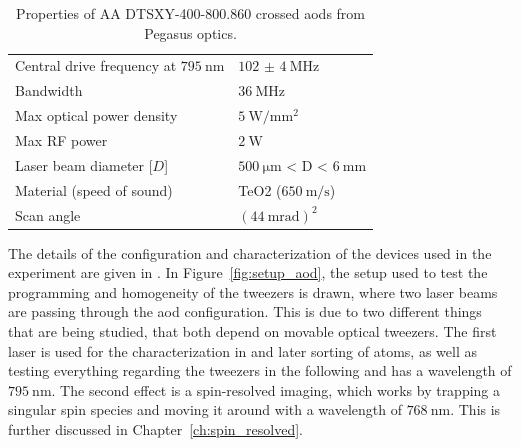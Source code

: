 \begin{table}[h]
\label{tbl:pegasus_aod}
\centering
\begin{tabular}{l|l}
	\hline \hline
	Central drive frequency at $\SI{795}{\nano\meter}$ & $\SI{102(4)}{\mega\hertz}$ \\
	Bandwidth & $\SI{36}{\mega\hertz}$ \\
	Max optical power density & $\SI{5}{\watt\per\milli\meter\squared}$ \\
	Max RF power & $\SI{2}{\watt}$ \\
	Laser beam diameter [$D$] & $\SI{500}{\micro\meter}$ < D < $\SI{6}{\milli\meter}$ \\
	Material (speed of sound) & TeO2 ($\SI{650}{\meter\per\second}$) \\
	Scan angle & $(\SI{44}{\milli\radian})^2$ \\
	\hline \hline
\end{tabular}
\caption{Properties of AA DTSXY-400-800.860 crossed \acp{aod} from Pegasus optics.}
\end{table}

\begin{figure}[ht]
	\label{fig:aod_pass}
\end{figure}

The details of the configuration and characterization of the devices used in the experiment are given in \cite{Osterholz2020}.
In Figure~\ref{fig:setup_aod}, the setup used to test the programming and homogeneity of the tweezers is drawn, where two laser beams are passing through the \ac{aod} configuration. This is due to two different things that are being studied, that both depend on movable optical tweezers. The first laser is used for the characterization in \cite{Osterholz2020} and later sorting of atoms, as well as testing everything regarding the tweezers in the following and has a wavelength of $\SI{795}{\nano\meter}$. The second effect is a spin-resolved imaging, which works by trapping a singular spin species and moving it around with a wavelength of $\SI{768}{\nano\meter}$. This is further discussed in Chapter~\ref{ch:spin_resolved}.


